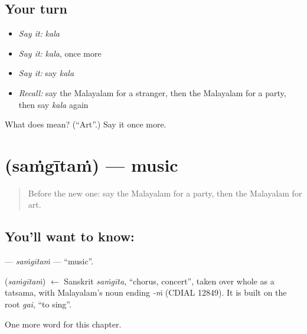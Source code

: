 \subsection*{Your turn}
\begin{itemize}
\raggedright
  \item \emph{Say it:} \emph{kala}
  \item \emph{Say it:} \emph{kala}, once more
  \item \emph{Say it:} say \emph{kala}
  \item \emph{Recall:} say the Malayalam for a stranger, then the Malayalam for a party, then say \emph{kala} again
\end{itemize}

\begin{tcolorbox}[breakable,colback=teal!4,colframe=teal!35!black,title={Before you move on}]
What does  mean? (\textquotedblleft{}Art\textquotedblright{}.) Say it once more.
\end{tcolorbox}
\section[\texorpdfstring{\ml{സംഗീതം} (saṁgītaṁ)}{സംഗീതം (saṁgītaṁ)}]{ (saṁgītaṁ) — music}

\label{lesson:ML-C212-samgitam}



\begin{quote}
Before the new one: say the Malayalam for a party, then the Malayalam for art.
\end{quote}

\subsection*{You'll want to know: }
\textbf{} — \emph{saṁgītaṁ} — \textquotedblleft{}music\textquotedblright{}.

\begin{cousinweb}
\textbf{} (\emph{saṁgītaṁ}) $\leftarrow$ Sanskrit \emph{saṁgīta}, \textquotedblleft{}chorus, concert\textquotedblright{}, taken over whole as a tatsama, with Malayalam's noun ending \emph{-ṁ} (CDIAL 12849). It is built on the root \emph{gai}, \textquotedblleft{}to sing\textquotedblright{}.
\end{cousinweb}

\begin{grammarlens}[title={What you've built}]
One more word for this chapter.
\end{grammarlens}

